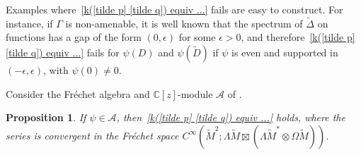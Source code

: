 \documentclass{memo-l}
\theoremstyle{plain}
\newtheorem{prop}[thm]{Proposition}
\theoremstyle{definition}
\theoremstyle{remark}
\newcommand{\C}{\mathbb{C}}
\renewcommand{\AA}{\mathcal{A}}
\numberwithin{section}{chapter}
\numberwithin{equation}{section}%
\begin{document}
Examples where~\eqref{k([tilde p] [tilde q]) equiv ...} fails are easy to construct. For instance, if $\Gamma$ is non-amenable, it is well known that the spectrum of $\widetilde\Delta$ on functions has a gap of the form $(0,\epsilon)$ for some $\epsilon>0$, and therefore~\eqref{k([tilde p] [tilde q]) equiv ...} fails for $\psi(D)$ and $\psi(\widetilde D)$ if $\psi$ is even and supported in $(-\epsilon,\epsilon)$, with $\psi(0)\ne0$.

Consider the Fr\'echet algebra and $\C[z]$-module $\AA$ of .

\begin{prop}\label{p: k(y y') equiv ...}
If $\psi\in\AA$, then~\eqref{k([tilde p] [tilde q]) equiv ...} holds, where the series is convergent in the Fr\'echet space $C^\infty(\widetilde M^2;\Lambda\widetilde M\boxtimes(\Lambda\widetilde M^*\otimes\Omega\widetilde M))$.
\end{prop}
\end{document}
